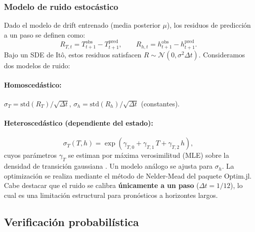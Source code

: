 \documentclass[11pt,a4paper]{article}
\newcommand{\Dt}{\Delta t}
\begin{document}
\subsubsection{Modelo de ruido estocástico}
\label{sec:noise}

Dado el modelo de drift entrenado (media posterior $\mu$), los residuos de predicción a un paso se definen como:
\begin{equation}
R_{T,t} = T_{t+1}^{\text{obs}} - T_{t+1}^{\text{pred}}, \qquad R_{h,t} = h_{t+1}^{\text{obs}} - h_{t+1}^{\text{pred}}.
\end{equation}
Bajo un SDE de Itô, estos residuos satisfacen $R \sim \mathcal{N}(0, \sigma^2 \Dt)$. Consideramos dos modelos de ruido:

\paragraph{Homoscedástico:} $\sigma_T = \text{std}(R_T)/\sqrt{\Dt}$, $\sigma_h = \text{std}(R_h)/\sqrt{\Dt}$ (constantes).

\paragraph{Heteroscedástico (dependiente del estado):}
\begin{equation}
\label{eq:hetero}
\sigma_T(T, h) = \exp(\gamma_{T,0} + \gamma_{T,1}\,T + \gamma_{T,2}\,h),
\end{equation}
cuyos parámetros $\gamma_T$ se estiman por máxima verosimilitud (MLE) sobre la densidad de transición gaussiana \citep{gardiner2009,kloeden1992}. Un modelo análogo se ajusta para $\sigma_h$. La optimización se realiza mediante el método de Nelder-Mead del paquete Optim.jl. Cabe destacar que el ruido se calibra \textbf{únicamente a un paso} ($\Delta t = 1/12$), lo cual es una limitación estructural para pronósticos a horizontes largos.

\subsection{Verificación probabilística}
\label{sec:verif}
\end{document}
